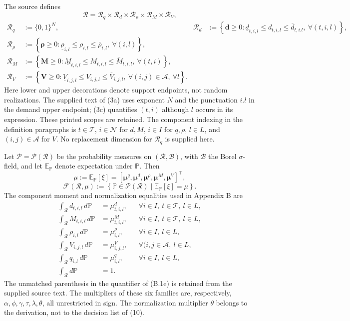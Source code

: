 \documentclass{article}
\begin{document}
The source defines
\[
\mathcal R=\mathcal R_q\times\mathcal R_d\times\mathcal R_\rho
\times\mathcal R_M\times\mathcal R_V,
\]
\begin{align}
\mathcal R_q&:=\{0,1\}^{N},&
\mathcal R_d&:=\left\{\boldsymbol d\geq0:
\underline d_{t,i,l}\leq d_{t,i,l}\leq\overline d_{t,i.l},\ \forall(t,i,l)\right\},\tag{3a}\\
\mathcal R_\rho&:=\left\{\boldsymbol\rho\geq0:
\underline\rho_{i,l}\leq\rho_{i,l}\leq\overline\rho_{i,l},\ \forall(i,l)\right\},\tag{3b}\\
\mathcal R_M&:=\left\{\boldsymbol M\geq0:
\underline M_{t,i,l}\leq M_{t,i,l}\leq\overline M_{t,i,l},\ \forall(t,i)\right\},\tag{3c}\\
\mathcal R_V&:=\left\{\boldsymbol V\geq0:
\underline V_{i,j,l}\leq V_{i,j,l}\leq\overline V_{i,j,l},\
\forall(i,j)\in\mathcal A,\ \forall l\right\}.\tag{3d}
\end{align}
Here lower and upper decorations denote support endpoints, not random realizations.
The supplied text of (3a) uses exponent $N$ and the punctuation $i.l$ in the demand
upper endpoint; (3c) quantifies $(t,i)$ although $l$ occurs in its expression. These
printed scopes are retained. The component indexing in the definition paragraphs is
$t\in\mathcal T$, $i\in\mathcal N$ for $d,M$, $i\in I$ for $q,\rho$, $l\in L$, and
$(i,j)\in\mathcal A$ for $V$. No replacement dimension for $\mathcal R_q$ is supplied here.

Let $\mathcal P=\mathcal P(\mathcal R)$ be the probability measures on
$(\mathcal R,\mathcal B)$, with $\mathcal B$ the Borel $\sigma$-field, and let
$\mathbb E_{\mathbb P}$ denote expectation under $\mathbb P$. Then
\[
\mu:=\mathbb E_{\mathbb P}[\xi]
=[\boldsymbol\mu^q,\boldsymbol\mu^d,\boldsymbol\mu^\rho,
\boldsymbol\mu^M,\boldsymbol\mu^V]^\top,
\]
\begin{equation}
\mathcal F(\mathcal R,\mu):=
\left\{\mathbb P\in\mathcal P(\mathcal R)\mid
\mathbb E_{\mathbb P}[\xi]=\mu\right\}.\tag{4}
\end{equation}
The component moment and normalization equalities used in Appendix B are
\begin{align}
\int_{\mathcal R}d_{t,i,l}\,d\mathbb P&=\mu^d_{t,i,l},
&&\forall i\in I,\ t\in\mathcal T,\ l\in L,\tag{B.1b}\\
\int_{\mathcal R}M_{t,i,l}\,d\mathbb P&=\mu^M_{t,i,l},
&&\forall i\in I,\ t\in\mathcal T,\ l\in L,\tag{B.1c}\\
\int_{\mathcal R}\rho_{i,l}\,d\mathbb P&=\mu^\rho_{i,l},
&&\forall i\in I,\ l\in L,\tag{B.1d}\\
\int_{\mathcal R}V_{i,j,l}\,d\mathbb P&=\mu^V_{i,j,l},
&&\forall(i,j\in\mathcal A,\ l\in L,\tag{B.1e}\\
\int_{\mathcal R}q_{i,l}\,d\mathbb P&=\mu^q_{i,l},
&&\forall i\in I,\ l\in L,\tag{B.1f}\\
\int_{\mathcal R}d\mathbb P&=1.\tag{B.1g}
\end{align}
The unmatched parenthesis in the quantifier of (B.1e) is retained from the supplied
source text. The multipliers of these six families are, respectively,
$\alpha,\phi,\gamma,\tau,\lambda,\theta$, all unrestricted in sign. The normalization
multiplier $\theta$ belongs to the derivation, not to the decision list of (10).
\end{document}
